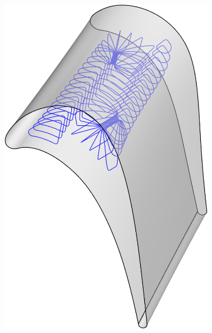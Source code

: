 \documentclass[8pt, aspectratio=169]{beamer}
\begin{document}
\begin{frame}
\begin{figure}
\begin{subfigure}{.49\textwidth}
			\includegraphics[height=.8\textheight]{../tec/channel/13.png}
		\end{subfigure}
	\end{figure}
\end{frame}
\end{document}
